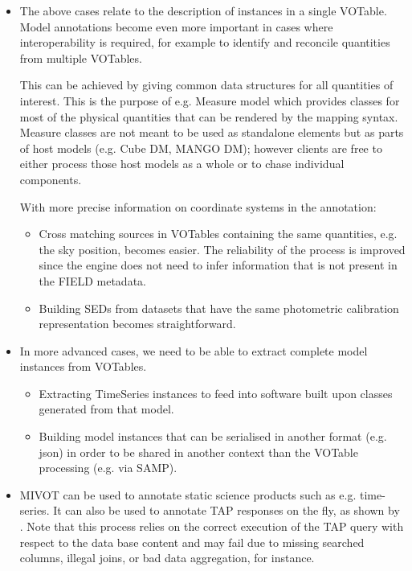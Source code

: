 \begin{itemize}
  \item The above cases relate to the description of instances in a
  single VOTable. Model annotations become even more important in cases
  where interoperability is required, for example to identify and
  reconcile quantities from multiple VOTables.

  This can be achieved by giving  common data structures for all 
  quantities of interest. This is the purpose of e.g. Measure model 
  which provides classes for most of the physical quantities that can 
  be rendered by the mapping syntax. Measure classes are not meant to 
  be used as standalone elements but as parts of host models 
  (e.g. Cube DM, MANGO DM);
  however clients are free to either process those host models as a
  whole or to chase individual components.
  
  With more precise information on coordinate systems in the annotation:
    \begin{itemize}
      \item Cross matching sources in VOTables containing the same quantities, e.g. the sky position, becomes easier.
            The reliability of the process is improved since the engine does not need to infer information that is not present in the FIELD metadata.
      \item Building SEDs from datasets that have the same photometric calibration representation becomes straightforward.
   \end{itemize}          

  \item In more advanced cases, we need to be able to extract complete model instances from VOTables.
    \begin{itemize}
      \item Extracting  TimeSeries instances to feed into software built upon classes generated from that model.
      \item Building model instances that can be serialised in another format (e.g. json) in order to be shared in another context than 
            the VOTable processing (e.g. via SAMP).
   \end{itemize}         
    
   \item MIVOT can be used to annotate static science products such as e.g. time-series. It can also be used to annotate 
    TAP responses on the fly, as shown by \cite{2201.01732}. Note that this process relies on the correct execution of the TAP query 
    with respect to the data base content and may fail due to missing searched columns, illegal joins, or bad data aggregation, for instance. 
   
    
\end{itemize} 

